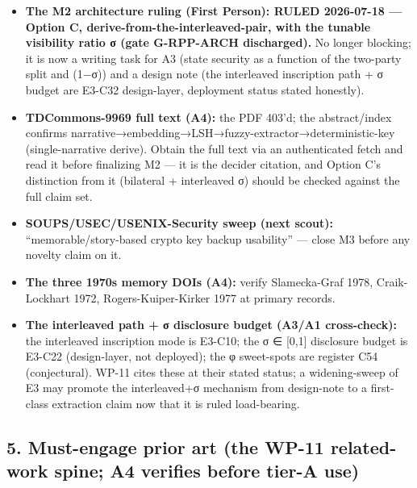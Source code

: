 \documentclass[
  11pt,
]{article}
\providecommand{\tightlist}{%
  \setlength{\itemsep}{0pt}\setlength{\parskip}{0pt}}
\begin{document}
\begin{itemize}
\tightlist
\item
  \textbf{The M2 architecture ruling (First Person): RULED 2026-07-18
  --- Option C, derive-from-the-interleaved-pair, with the tunable
  visibility ratio σ (gate G-RPP-ARCH discharged).} No longer blocking;
  it is now a writing task for A3 (state security as a function of the
  two-party split and (1−σ)) and a design note (the interleaved
  inscription path + σ budget are E3-C32 design-layer, deployment status
  stated honestly).
\item
  \textbf{TDCommons-9969 full text (A4):} the PDF 403'd; the
  abstract/index confirms
  narrative→embedding→LSH→fuzzy-extractor→deterministic-key
  (single-narrative derive). Obtain the full text via an authenticated
  fetch and read it before finalizing M2 --- it is the decider citation,
  and Option C's distinction from it (bilateral + interleaved σ) should
  be checked against the full claim set.
\item
  \textbf{SOUPS/USEC/USENIX-Security sweep (next scout):}
  ``memorable/story-based crypto key backup usability'' --- close M3
  before any novelty claim on it.
\item
  \textbf{The three 1970s memory DOIs (A4):} verify Slamecka-Graf 1978,
  Craik-Lockhart 1972, Rogers-Kuiper-Kirker 1977 at primary records.
\item
  \textbf{The interleaved path + σ disclosure budget (A3/A1
  cross-check):} the interleaved inscription mode is E3-C10; the σ ∈
  {[}0,1{]} disclosure budget is E3-C22 (design-layer, not deployed);
  the φ sweet-spots are register C54 (conjectural). WP-11 cites these at
  their stated status; a widening-sweep of E3 may promote the
  interleaved+σ mechanism from design-note to a first-class extraction
  claim now that it is ruled load-bearing.
\end{itemize}

\subsection{5. Must-engage prior art (the WP-11 related-work spine; A4
verifies before tier-A
use)}\label{must-engage-prior-art-the-wp-11-related-work-spine-a4-verifies-before-tier-a-use}
\end{document}
